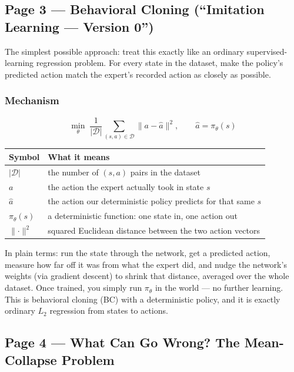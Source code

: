 \subsection*{Page 3 --- Behavioral Cloning (``Imitation Learning --- Version 0'')}

The simplest possible approach: treat this exactly like an ordinary supervised-learning regression problem. For every state in the dataset, make the policy's predicted action match the expert's recorded action as closely as possible.

\subsubsection*{Mechanism}

\[
\min_\theta \; \frac{1}{|\mathcal{D}|} \sum_{(s,a) \in \mathcal{D}} \lVert a - \hat a \rVert^2, \qquad \hat a = \pi_\theta(s)
\]

\begin{center}
\begin{tabular}{@{}ll@{}}
\toprule
Symbol & What it means \\
\midrule
$|\mathcal{D}|$ & the number of $(s,a)$ pairs in the dataset \\
$a$ & the action the expert actually took in state $s$ \\
$\hat a$ & the action our deterministic policy predicts for that same $s$ \\
$\pi_\theta(s)$ & a deterministic function: one state in, one action out \\
$\lVert \cdot \rVert^2$ & squared Euclidean distance between the two action vectors \\
\bottomrule
\end{tabular}
\end{center}

In plain terms: run the state through the network, get a predicted action, measure how far off it was from what the expert did, and nudge the network's weights (via gradient descent) to shrink that distance, averaged over the whole dataset. Once trained, you simply run $\pi_\theta$ in the world --- no further learning. This is behavioral cloning (BC) with a deterministic policy, and it is exactly ordinary $L_2$ regression from states to actions.

\subsection*{Page 4 --- What Can Go Wrong? The Mean-Collapse Problem}

